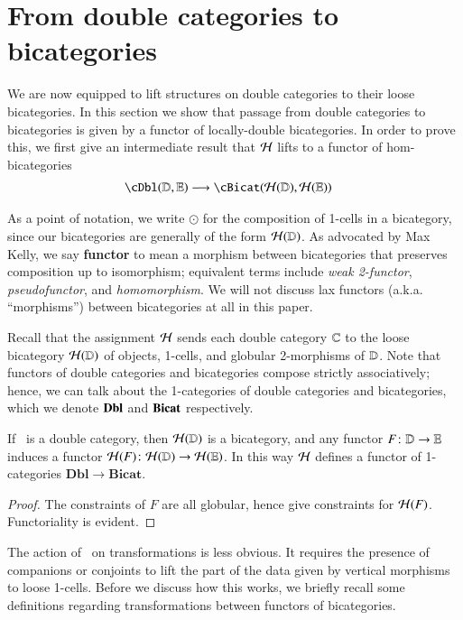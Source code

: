 \section{From double categories to bicategories}
\label{sec:1x1-to-bicat}

We are now equipped to lift structures on double categories to
their loose bicategories.  In this section we show that passage
from double categories to bicategories is given by a functor of locally-double bicategories. In order to prove this, we first give an intermediate result that $\mathcal{H}$ lifts to a functor of hom-bicategories
\begin{align}
    \cDbl(\lD,\lE) &\too \cBicat(\cH(\lD),\cH(\lE))
\end{align}

As a point of notation, we write $\odot$ for the composition of
1-cells in a bicategory, since our bicategories are generally of the
form $\mathcal{H}(\mathbb{D})$.  As advocated by Max Kelly, we say \textbf{functor}
to mean a morphism between bicategories that preserves composition up
to isomorphism; equivalent terms include \emph{weak 2-functor},
\emph{pseudofunctor}, and \emph{homomorphism}.
We will not discuss lax functors (a.k.a. ``morphisms'') between bicategories at all in this paper.

Recall that the assignment $\mathcal{H}$ sends each double category $\mathbb{C}$ to the loose bicategory  $\mathcal{H}(\mathbb{D})$ of objects, 1-cells, and globular 2-morphisms of $\mathbb{D}$.  Note that functors of double categories and bicategories compose strictly associatively; hence, we can talk about the 1-categories of double categories and bicategories, which we denote ${\bf Dbl}$ and ${\bf Bicat}$ respectively.

\begin{thm}\label{thm:1-func}
 If \lD\ is a double category, then $\mathcal{H}(\mathbb{D})$ is a bicategory, and
  any functor $F\colon \mathbb{D}\to\mathbb{E}$ induces a functor $\mathcal{H}(F)\colon
  \mathcal{H}(\mathbb{D})\to\mathcal{H}(\mathbb{E})$.  In this way $\mathcal{H}$ defines a functor of
  1-categories $\mathbf{Dbl}\to \mathbf{Bicat}$.
\end{thm}
\begin{proof}
 The constraints of $F$ are all globular, hence give constraints for
  $\mathcal{H}(F)$.  Functoriality is evident.
\end{proof}

The action of \cH\ on transformations is less obvious. It
requires the presence of companions or conjoints to lift the part of the data given by vertical morphisms to loose 1-cells. Before we discuss how this works, we briefly recall some definitions regarding transformations between functors of bicategories.

